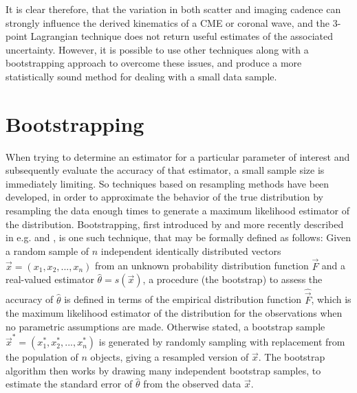 \documentclass[structabstract]{aa}
\begin{document}


It is clear therefore, that the variation in both scatter and imaging cadence can strongly influence the derived kinematics of a CME or coronal wave, and the 3-point Lagrangian technique does not return useful estimates of the associated uncertainty. However, it is possible to use other techniques along with a bootstrapping approach to overcome these issues, and produce a more statistically sound method for dealing with a small data sample. 


\section{Bootstrapping}
\label{sect:bootstrapping}

When trying to determine an estimator for a particular parameter of interest and subsequently evaluate the accuracy of that estimator, a small sample size is immediately limiting. So techniques based on resampling methods have been developed, in order to approximate the behavior of the true distribution by resampling the data enough times to generate a maximum likelihood estimator of the distribution. Bootstrapping, first introduced by \citet{Efron:1979p1831} and more recently described in e.g. \citet{1994.book.Efron} and \citet{Chernick1999}, is one such technique, that may be formally defined as follows: Given a random sample of $n$ independent identically distributed vectors $\vec{x} = \left( x_1, x_2, ..., x_n \right)$ from an unknown probability distribution function $\vec{F}$ and a real-valued estimator $\hat{\theta} = s \left( \vec{x} \right)$, a procedure (the bootstrap) to assess the accuracy of $\hat{\theta}$ is defined in terms of the empirical distribution function $\hat{\vec{F}}$, which is the maximum likelihood estimator of the distribution for the observations when no parametric assumptions are made. Otherwise stated, a bootstrap sample $\vec{x}^* = \left( x_1^*, x_2^*, ..., x_n^* \right)$ is generated by randomly sampling with replacement from the population of $n$ objects, giving a resampled version of $\vec{x}$. The bootstrap algorithm then works by drawing many independent bootstrap samples, to estimate the standard error of $\hat{\theta}$ from the observed data $\vec{x}$.
\end{document}
